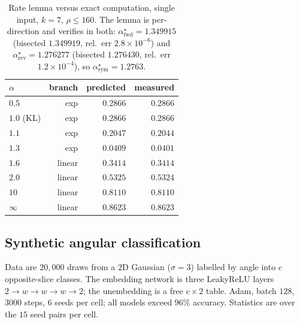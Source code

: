 \documentclass[10pt,letterpaper,twocolumn]{article}
\newcommand{\TODO}[1]{}
\newcommand{\GATE}[1]{\textcolor{blue}{\textsf{\scriptsize (#1)}}}
\theoremstyle{plain}
\theoremstyle{definition}
\theoremstyle{remark}
\begin{document}
\begin{table}[t]
\centering\small
\caption{Rate lemma versus exact computation, single input, $k=7$,
$\rho\le160$. The lemma is per-direction and verifies in both:
$\alpha^{\star}_{\mathrm{fwd}}=1.349915$ (bisected $1.349919$, rel.\ err
$2.8\times10^{-6}$) and $\alpha^{\star}_{\mathrm{rev}}=1.276277$ (bisected
$1.276430$, rel.\ err $1.2\times10^{-4}$), so
$\alpha^{\star}_{\mathrm{sym}}=1.2763$.}
\label{tab:gate1}
\begin{tabular}{@{}lrrr@{}}
\toprule
$\alpha$ & branch & predicted & measured \\
\midrule
$0.5$      & exp    & $0.2866$ & $0.2866$ \\
$1.0$ (KL) & exp    & $0.2866$ & $0.2866$ \\
$1.1$      & exp    & $0.2047$ & $0.2044$ \\
$1.3$      & exp    & $0.0409$ & $0.0401$ \\
$1.6$      & linear & $0.3414$ & $0.3414$ \\
$2.0$      & linear & $0.5325$ & $0.5324$ \\
$10$       & linear & $0.8110$ & $0.8110$ \\
$\infty$   & linear & $0.8623$ & $0.8623$ \\
\bottomrule
\end{tabular}
\end{table}

\TODO{Add the averaging study: decay stays exponential ($R^{2}=1.00$ vs $0.91$
for a power law) but the rate is set by the \emph{minimum margin over the input
support}, dropping $0.193\to0.018$ when clusters touch the decision boundary.
State rates as a function of the margin floor. \GATE{G2}}

\subsection{Synthetic angular classification}
\label{sec:exp-synthetic}

Data are $20{,}000$ draws from a $2$D Gaussian ($\sigma=3$) labelled by angle
into $c$ opposite-slice classes. The embedding network is three LeakyReLU
layers $2\!\to\!w\!\to\!w\!\to\!w\!\to\!2$; the unembedding is a free
$c\times2$ table. Adam, batch $128$, $3000$ steps, $6$ seeds per cell; all
models exceed $96\%$ accuracy. Statistics are over the $15$ seed pairs per
cell.
\end{document}
